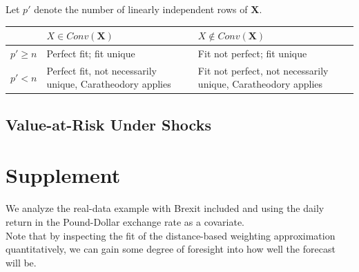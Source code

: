 \documentclass[11pt]{article}
\newcommand{\X}{\textbf{X}}
\theoremstyle{definition}
\begin{document}
Let $p'$ denote the number of linearly independent rows of $\X$.\\

    \begin{center}
      \begin{tabular}{ | m{3em} | m{7cm}| m{7cm} | } 
        \hline
        & $X\in Conv(\X)$ & $X \notin Conv(\X)$\\ 
        \hline
        $p' \geq n$ & Perfect fit; fit unique & Fit not perfect; fit unique \\
        \hline
        $p' < n$ & Perfect fit, not necessarily unique, Caratheodory applies \citep{abadie2022synthetic}& Fit not perfect, not necessarily unique, Caratheodory applies \\ 
        \hline
      \end{tabular}
      \end{center}

\subsection{Value-at-Risk Under Shocks}


\section{Supplement}
We analyze the real-data example with Brexit included and using the daily return in the Pound-Dollar exchange rate as a covariate. \\

Note that by inspecting the fit of the distance-based weighting approximation quantitatively, we can gain some degree of foresight into how well the forecast will be.

\clearpage



 
\end{document}
